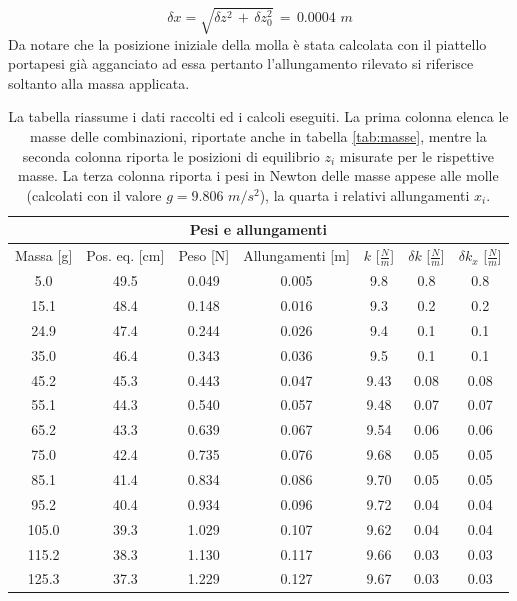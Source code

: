 \begin{equation*}
	\delta x = \sqrt{\delta z^2\, + \,\delta z_0^2} \,=\, 0.0004 \,\, m
\end{equation*}
%
Da notare che la posizione iniziale della molla è stata calcolata con il piattello portapesi già agganciato ad essa pertanto l'allungamento rilevato si riferisce soltanto alla massa applicata.

\begin{table}
    \centering
    \begin{tabular}{c c c c c c c}
        \multicolumn{7}{c}{\textbf{Pesi e allungamenti}} \\[1mm]
        \toprule
        Massa [g] & Pos. eq. [cm] & Peso [N] & Allungamenti [m] & $k$ [$\frac{N}{m}$] & $\delta k$ [$\frac{N}{m}$] & $\delta k_x$ [$\frac{N}{m}$]\\
        \midrule
        5.0 & 49.5 & 0.049 & 0.005 & 9.8 & 0.8 & 0.8 \\
		15.1 & 48.4 & 0.148 & 0.016 & 9.3 & 0.2 & 0.2 \\
		24.9 & 47.4 & 0.244 & 0.026 & 9.4 & 0.1 & 0.1 \\
		35.0 & 46.4 & 0.343 & 0.036 & 9.5 & 0.1 & 0.1 \\
		45.2 & 45.3 & 0.443 & 0.047 & 9.43 & 0.08 & 0.08 \\
		55.1 & 44.3 & 0.540 & 0.057 & 9.48 & 0.07 & 0.07 \\
		65.2 & 43.3 & 0.639 & 0.067 & 9.54 & 0.06 & 0.06 \\
		75.0 & 42.4 & 0.735 & 0.076 & 9.68 & 0.05 & 0.05 \\
		85.1 & 41.4 & 0.834 & 0.086 & 9.70 & 0.05 & 0.05 \\
		95.2 & 40.4 & 0.934 & 0.096 & 9.72 & 0.04 & 0.04 \\
		105.0 & 39.3 & 1.029 & 0.107 & 9.62 & 0.04 & 0.04 \\
		115.2 & 38.3 & 1.130 & 0.117 & 9.66 & 0.03 & 0.03 \\
		125.3 & 37.3 & 1.229 & 0.127 & 9.67 & 0.03 & 0.03 \\
        \bottomrule
    \end{tabular}
    \caption{La tabella riassume i dati raccolti ed i calcoli eseguiti. La prima colonna elenca le masse delle combinazioni, riportate anche in tabella
        \ref{tab:masse}, mentre la seconda colonna riporta le posizioni di equilibrio $z_i$ misurate per le rispettive masse.
        La terza colonna riporta i pesi in Newton 
        delle masse appese alle molle (calcolati con il valore $g = 9.806 \,\, m/s^2$), la quarta i relativi allungamenti $x_i$.
}
\end{table}
